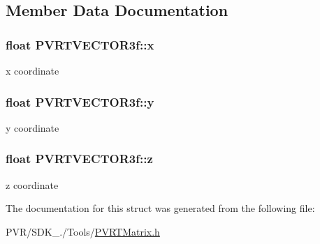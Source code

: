\subsection{Member Data Documentation}
\hypertarget{struct_p_v_r_t_v_e_c_t_o_r3f_adf8b2ea9a8c9bead165124ae1a2ac48d}{
\subsubsection[{x}]{\setlength{\rightskip}{0pt plus 5cm}float P\+V\+R\+T\+V\+E\+C\+T\+O\+R3f\+::x}}\label{struct_p_v_r_t_v_e_c_t_o_r3f_adf8b2ea9a8c9bead165124ae1a2ac48d}
x coordinate \hypertarget{struct_p_v_r_t_v_e_c_t_o_r3f_ae42f2f74d7c306f18971140fe4f3e669}{
\subsubsection[{y}]{\setlength{\rightskip}{0pt plus 5cm}float P\+V\+R\+T\+V\+E\+C\+T\+O\+R3f\+::y}}\label{struct_p_v_r_t_v_e_c_t_o_r3f_ae42f2f74d7c306f18971140fe4f3e669}
y coordinate \hypertarget{struct_p_v_r_t_v_e_c_t_o_r3f_aaef9d57b2c8dbc6944dc704ccff65374}{
\subsubsection[{z}]{\setlength{\rightskip}{0pt plus 5cm}float P\+V\+R\+T\+V\+E\+C\+T\+O\+R3f\+::z}}\label{struct_p_v_r_t_v_e_c_t_o_r3f_aaef9d57b2c8dbc6944dc704ccff65374}
z coordinate 

The documentation for this struct was generated from the following file\+:\begin{DoxyCompactItemize}
\item 
P\+V\+R/\+S\+D\+K\+\_./\+Tools/\hyperlink{_p_v_r_t_matrix_8h}{P\+V\+R\+T\+Matrix.\+h}\end{DoxyCompactItemize}
